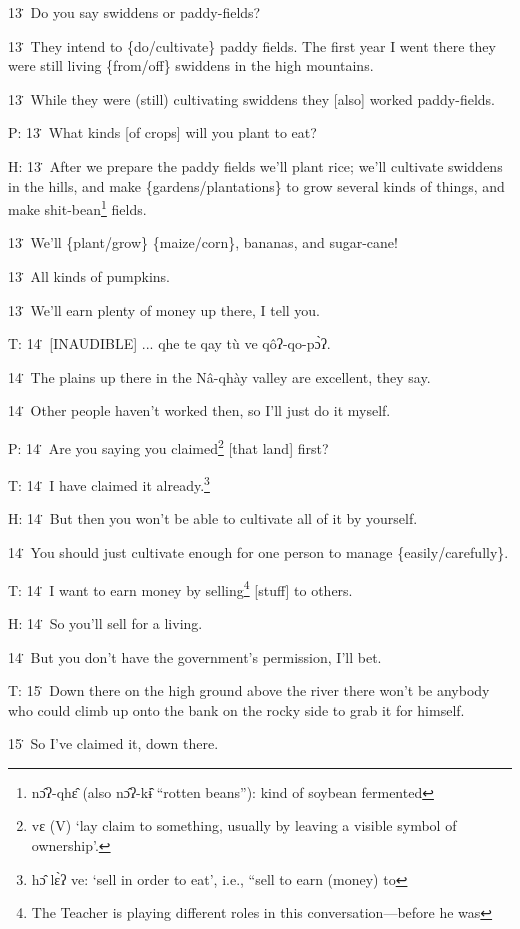 13\. Do you say swiddens or paddy-fields?

13\. They intend to \{do/cultivate\} paddy fields. The first year I went there
they were still living \{from/off\} swiddens in the high mountains.

13\. While they were (still) cultivating swiddens they [also] worked paddy-fields.

P: 13\. What kinds [of crops] will you plant to eat?

H: 13\. After we prepare the paddy fields we'll plant rice; we'll cultivate swiddens
in the hills, and make \{gardens/plantations\} to grow several kinds of things,
and make shit-bean\footnote{nɔ̂ʔ-qhɛ̂ (also nɔ̂ʔ-kɨ̂ ``rotten beans''): kind of soybean fermented} fields.

13\. We'll \{plant/grow\} \{maize/corn\}, bananas, and sugar-cane!

13\. All kinds of pumpkins.

13\. We'll earn plenty of money up there, I tell you.

T: 14\. [INAUDIBLE] ... qhe te qay tù ve qôʔ-qo-pɔ̀ʔ.

14\. The plains up there in the Nâ-qhày valley are excellent, they say.

14\. Other people haven't worked then, so I'll just do it myself.

P: 14\. Are you saying you claimed\footnote{vɛ (V) `lay claim to something, usually by leaving a visible symbol of ownership'.} [that land] first?

T: 14\. I have claimed it already.\footnote{hɔ̂ lɛ̀ʔ ve: `sell in order to eat', i.e., ``sell to earn (money) to}

H: 14\. But then you won't be able to cultivate all of it by yourself.

14\. You should just cultivate enough for one person to manage \{easily/carefully\}.

T: 14\. I want to earn money by selling\footnote{The Teacher is playing different roles in this conversation---before he was} [stuff] to others.

H: 14\. So you'll sell for a living.

14\. But you don't have the government's permission, I'll bet.

T: 15\. Down there on the high ground above the river there won't be anybody who
could climb up onto the bank on the rocky side to grab it for himself.

15\. So I've claimed it, down there.


